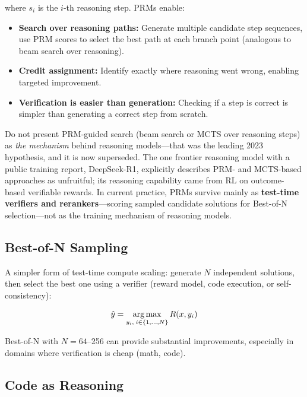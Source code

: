 where $s_i$ is the $i$-th reasoning step.  PRMs enable:
\begin{itemize}[leftmargin=*]
\item \textbf{Search over reasoning paths:} Generate multiple candidate
  step sequences, use PRM scores to select the best path at each branch
  point (analogous to beam search over reasoning).
\item \textbf{Credit assignment:} Identify exactly where reasoning went
  wrong, enabling targeted improvement.
\item \textbf{Verification is easier than generation:} Checking if a step
  is correct is simpler than generating a correct step from scratch.
\end{itemize}

\begin{warningbox}
Do not present PRM-guided search (beam search or MCTS over reasoning steps)
as \emph{the mechanism} behind reasoning models---that was the leading 2023
hypothesis, and it is now superseded.  The one frontier reasoning model with
a public training report, DeepSeek-R1, explicitly describes PRM- and
MCTS-based approaches as unfruitful; its reasoning capability came from RL
on outcome-based verifiable rewards.  In current practice, PRMs survive
mainly as \textbf{test-time verifiers and rerankers}---scoring sampled
candidate solutions for Best-of-N selection---not as the training mechanism
of reasoning models.
\end{warningbox}

\subsection{Best-of-N Sampling}

A simpler form of test-time compute scaling: generate $N$ independent
solutions, then select the best one using a verifier (reward model, code
execution, or self-consistency):

\begin{equation}
\hat{y} = \operatorname*{arg\,max}_{y_i,\; i \in \{1, \ldots, N\}} R(x, y_i)
\label{eq:best_of_n}
\end{equation}

Best-of-N with $N = 64$--256 can provide substantial improvements,
especially in domains where verification is cheap (math, code).

\subsection{Code as Reasoning}

